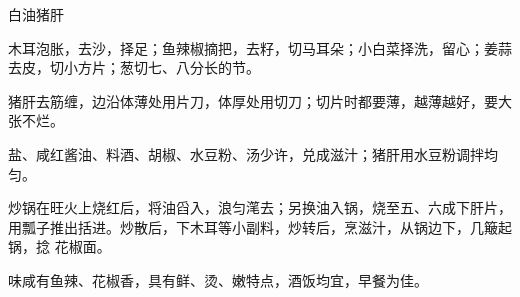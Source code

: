 %
%
%
%
%
%
%
\begin{recipe}{白油猪肝}

\ingredients


\preparation

\step 木耳泡胀，去沙，择足；鱼辣椒摘把，去籽，切马耳朵；小白菜择洗，留心；姜蒜
去皮，切小方片；葱切七、八分长的节。

\step 猪肝去筋缠，边沿体薄处用片刀，体厚处用切刀；切片时都要薄，越薄越好，要大
张不烂。

\step 盐、咸红酱油、料酒、胡椒、水豆粉、汤少许，兑成滋汁；猪肝用水豆粉调拌均匀。

\step 炒锅在旺火上烧红后，将油舀入，浪匀滗去；另换油入锅，烧至五、六成下肝片，
用瓢子推出括进。炒散后，下木耳等小副料，炒转后，烹滋汁，从锅边下，几簸起锅，捻
花椒面。

\features

味咸有鱼辣、花椒香，具有鲜、烫、嫩特点，酒饭均宜，早餐为佳。

\end{recipe}

